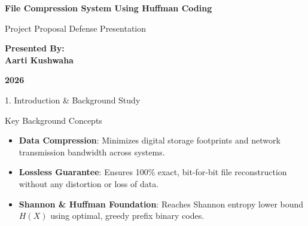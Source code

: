 \documentclass[aspectratio=169,11pt]{beamer}
\begin{document}
\begin{frame}[plain]
    \centering
    \vspace*{0.8cm}
    
    {\fontsize{19}{25}\selectfont \textbf{\color{primaryblue} File Compression System Using Huffman Coding}\par}
    \vspace{0.4cm}
    {\fontsize{13}{18}\selectfont \color{darkslate} Project Proposal Defense Presentation\par}
    \vspace{1.2cm}
    
    {\fontsize{14}{18}\selectfont \textbf{Presented By:}\\[0.25cm]
    {\fontsize{16}{20}\selectfont \textbf{Aarti Kushwaha}}\par}
    
    \vfill
    {\fontsize{13}{17}\selectfont \textbf{2026}\par}
    \vspace*{0.4cm}
\end{frame}

\begin{frame}{1. Introduction \& Background Study}
    \begin{block}{Key Background Concepts}
        \begin{itemize}
            \item \textbf{Data Compression}: Minimizes digital storage footprints and network transmission bandwidth across systems.
            \item \textbf{Lossless Guarantee}: Ensures 100\% exact, bit-for-bit file reconstruction without any distortion or loss of data.
            \item \textbf{Shannon \& Huffman Foundation}: Reaches Shannon entropy lower bound $H(X)$ using optimal, greedy prefix binary codes.
        \end{itemize}
    \end{block}
\end{frame}
\end{document}
